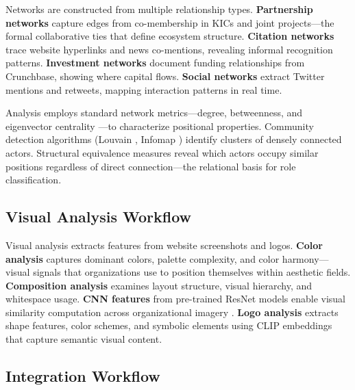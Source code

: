 \documentclass[../main.tex]{subfiles}
\begin{document}
Networks are constructed from multiple relationship types. \textbf{Partnership networks} capture edges from co-membership in KICs and joint projects---the formal collaborative ties that define ecosystem structure. \textbf{Citation networks} trace website hyperlinks and news co-mentions, revealing informal recognition patterns. \textbf{Investment networks} document funding relationships from Crunchbase, showing where capital flows. \textbf{Social networks} extract Twitter mentions and retweets, mapping interaction patterns in real time.

Analysis employs standard network metrics---degree, betweenness, and eigenvector centrality \cite{newman2010networks,borgatti2009network}---to characterize positional properties. Community detection algorithms (Louvain \cite{blondel2008louvain}, Infomap \cite{rosvall2008infomap}) identify clusters of densely connected actors. Structural equivalence measures \cite{wasserman1994social} reveal which actors occupy similar positions regardless of direct connection---the relational basis for role classification.

\subsection{Visual Analysis Workflow}

Visual analysis extracts features from website screenshots and logos. \textbf{Color analysis} captures dominant colors, palette complexity, and color harmony---visual signals that organizations use to position themselves within aesthetic fields. \textbf{Composition analysis} examines layout structure, visual hierarchy, and whitespace usage. \textbf{CNN features} from pre-trained ResNet models \cite{he2016resnet} enable visual similarity computation across organizational imagery \cite{krizhevsky2012imagenet}. \textbf{Logo analysis} extracts shape features, color schemes, and symbolic elements using CLIP embeddings \cite{radford2021clip} that capture semantic visual content.

\subsection{Integration Workflow}
\end{document}
